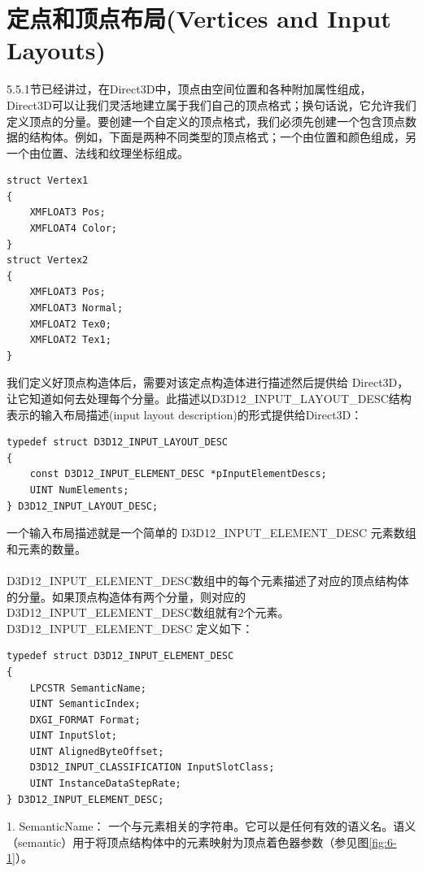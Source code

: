 \documentclass[11pt,a4paper,oldfontcommands]{memoir}
\begin{document}
{\section{定点和顶点布局(Vertices and Input Layouts)}
\begin{flushleft}
5.5.1节已经讲过，在Direct3D中，顶点由空间位置和各种附加属性组成，Direct3D可以让我们灵活地建立属于我们自己的顶点格式；换句话说，它允许我们定义顶点的分量。要创建一个自定义的顶点格式，我们必须先创建一个包含顶点数据的结构体。例如，下面是两种不同类型的顶点格式；一个由位置和颜色组成，另一个由位置、法线和纹理坐标组成。
\end{flushleft}
\begin{lstlisting}
struct Vertex1
{
    XMFLOAT3 Pos;
    XMFLOAT4 Color;
}
struct Vertex2
{
    XMFLOAT3 Pos;
    XMFLOAT3 Normal;
    XMFLOAT2 Tex0;
    XMFLOAT2 Tex1;
}
\end{lstlisting}
\begin{flushleft}
我们定义好顶点构造体后，需要对该定点构造体进行描述然后提供给 Direct3D，让它知道如何去处理每个分量。此描述以D3D12\_INPUT\_LAYOUT\_DESC结构表示的输入布局描述(input layout description)的形式提供给Direct3D：
\begin{lstlisting}
typedef struct D3D12_INPUT_LAYOUT_DESC
{
    const D3D12_INPUT_ELEMENT_DESC *pInputElementDescs;
    UINT NumElements;
} D3D12_INPUT_LAYOUT_DESC;
\end{lstlisting}
一个输入布局描述就是一个简单的 D3D12\_INPUT\_ELEMENT\_DESC 元素数组和元素的数量。\\
~\\
D3D12\_INPUT\_ELEMENT\_DESC数组中的每个元素描述了对应的顶点结构体的分量。如果顶点构造体有两个分量，则对应的 D3D12\_INPUT\_ELEMENT\_DESC数组就有2个元素。D3D12\_INPUT\_ELEMENT\_DESC 定义如下：
\begin{lstlisting}
typedef struct D3D12_INPUT_ELEMENT_DESC
{
    LPCSTR SemanticName;
    UINT SemanticIndex;
    DXGI_FORMAT Format;
    UINT InputSlot;
    UINT AlignedByteOffset;
    D3D12_INPUT_CLASSIFICATION InputSlotClass;
    UINT InstanceDataStepRate;
} D3D12_INPUT_ELEMENT_DESC;
\end{lstlisting}
1. SemanticName： 一个与元素相关的字符串。它可以是任何有效的语义名。语义（semantic）用于将顶点结构体中的元素映射为顶点着色器参数（参见图\ref{fig:6-1}）。\\
\begin{figure}[h]

\end{figure}
\end{flushleft}}
\end{document}
